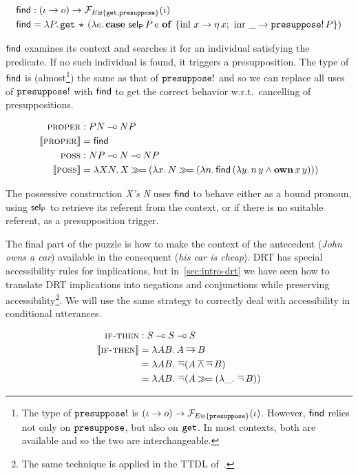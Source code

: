 \begin{align*}
  \textsf{find} &: (\iota \to o) \to \mathcal{F}_{E \uplus \{\mathtt{get}, \mathtt{presuppose}\}}(\iota) \\
  \textsf{find} &= \lambda P.\, \mathtt{get}\,\star\,(\lambda e.\, \text{\textbf{case} $\textsf{sel}_{\textsf{P}}\,P\,e$ \textbf{of} $\{ \operatorname{inl}\,x \to \eta\,x;\ \operatorname{inr}\,\_ \to \mathtt{presuppose}!\,P \}$})
\end{align*}

$\textsf{find}$ examines its context and searches it for an individual satisfying
the predicate. If no such individual is found, it triggers a
presupposition. The type of $\textsf{find}$ is (almost\footnote{The type of
  $\mathtt{presuppose}!$ is
  $(\iota \to o) \to \mathcal{F}_{E \uplus \{\mathtt{presuppose}\}}(\iota)$. However,
  $\textsf{find}$ relies not only on $\mathtt{presuppose}$, but also on $\mathtt{get}$. In
  most contexts, both are available and so the two are interchangeable.})
the same as that of $\mathtt{presuppose}!$ and so we can replace all uses of
$\mathtt{presuppose}!$ with $\textsf{find}$ to get the correct behavior w.r.t.\
cancelling of presuppositions.

\begin{align*}
  \textsc{proper} &: PN \mathbin{{-}\mkern-3.5mu{\circ}} NP \\
  \llbracket \textsc{proper} \rrbracket &= \textsf{find} \\
  \textsc{poss} &: NP \mathbin{{-}\mkern-3.5mu{\circ}} N \mathbin{{-}\mkern-3.5mu{\circ}} NP \\
  \llbracket \textsc{poss} \rrbracket &= \lambda X N.\, X \mathbin{\gg\!=} (\lambda x.\, N \mathbin{\gg\!=} (\lambda n.\, \textsf{find}\,(\lambda y.\, n\,y \land \textbf{own}\,x\,y)))
\end{align*}

The possessive construction \emph{X's N} uses $\textsf{find}$ to behave either as a
bound pronoun, using $\textsf{sel}_{\textsf{P}}$ to retrieve its referent from the context, or
if there is no suitable referent, as a presupposition trigger.

The final part of the puzzle is how to make the context of the antecedent
(\emph{John owns a car}) available in the consequent (\emph{his car is
  cheap}). DRT has special accessibility rules for implications, but
in~\ref{sec:intro-drt} we have seen how to translate DRT implications into
negations and conjunctions while preserving accessibility\footnote{The same
  technique is applied in the TTDL of~\cite{lebedeva2012expression}.}. We
will use the same strategy to correctly deal with accessibility in
conditional utterances.

\begin{align*}
  \textsc{if-then} &: S \mathbin{{-}\mkern-3.5mu{\circ}} S \mathbin{{-}\mkern-3.5mu{\circ}} S \\
  \llbracket \textsc{if-then} \rrbracket &= \lambda A B.\, A \mathbin{\overline{\to}} B \\
  &= \lambda A B.\, \mathop{\overline{\lnot}} (A \mathbin{\overline{\land}} \mathop{\overline{\lnot}} B) \\
  &= \lambda A B.\, \mathop{\overline{\lnot}} (A \mathbin{\gg\!=} (\lambda \_.\, \mathop{\overline{\lnot}} B))
\end{align*}

